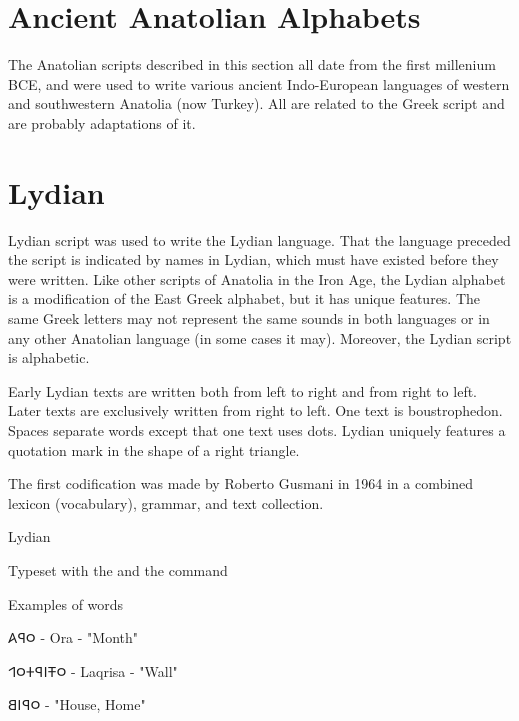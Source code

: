 \newfontfamily{}
\large\brill
\section{Ancient Anatolian Alphabets}
\label{s:anatolian}
The Anatolian scripts described in this section all date from the first millenium BCE, and were used to write various ancient Indo-European languages of western and southwestern Anatolia (now Turkey). All are related to the Greek script and are probably adaptations of it. 






\section{Lydian}
\label{sec:lydian}
 Lydian script was used to write the Lydian language. That the language preceded the script is indicated by names in Lydian, which must have existed before they were written. Like other scripts of Anatolia in the Iron Age, the Lydian alphabet is a modification of the East Greek alphabet, but it has unique features. The same Greek letters may not represent the same sounds in both languages or in any other Anatolian language (in some cases it may). Moreover, the Lydian script is alphabetic.



Early Lydian texts are written both from left to right and from right to left. Later texts are exclusively written from right to left. One text is boustrophedon. Spaces separate words except that one text uses dots. Lydian uniquely features a quotation mark in the shape of a right triangle.

The first codification was made by Roberto Gusmani in 1964 in a combined lexicon (vocabulary), grammar, and text collection.

\begin{scriptexample}[]{Lydian}

\medskip

Typeset with the  and the command \cmd{\lydian}
\end{scriptexample}

Examples of words

\bgroup\lydian
𐤬𐤭𐤠  - Ora - "Month"

𐤬𐤳𐤦𐤭𐤲𐤬𐤩  - Laqrisa - "Wall"

𐤬𐤭𐤦𐤡  - "House, Home"

\egroup

